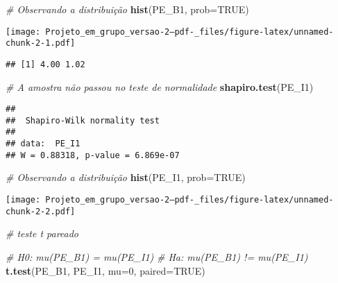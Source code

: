 \documentclass[
]{article}
\newenvironment{Shaded}{\begin{snugshade}}{\end{snugshade}}
\newcommand{\AttributeTok}[1]{\textcolor[rgb]{0.13,0.29,0.53}{#1}}
\newcommand{\CommentTok}[1]{\textcolor[rgb]{0.56,0.35,0.01}{\textit{#1}}}
\newcommand{\ConstantTok}[1]{\textcolor[rgb]{0.56,0.35,0.01}{#1}}
\newcommand{\DecValTok}[1]{\textcolor[rgb]{0.00,0.00,0.81}{#1}}
\newcommand{\FunctionTok}[1]{\textcolor[rgb]{0.13,0.29,0.53}{\textbf{#1}}}
\newcommand{\NormalTok}[1]{#1}
\newcommand{\OtherTok}[1]{\textcolor[rgb]{0.56,0.35,0.01}{#1}}
\newcommand{\SpecialCharTok}[1]{\textcolor[rgb]{0.81,0.36,0.00}{\textbf{#1}}}
\begin{document}
\begin{Shaded}
\begin{Highlighting}[]
\CommentTok{\# Observando a distribuição}
\FunctionTok{hist}\NormalTok{(PE\_B1, }\AttributeTok{prob=}\ConstantTok{TRUE}\NormalTok{)}
\end{Highlighting}
\end{Shaded}

\texttt{[image: Projeto\_em\_grupo\_versao-2--pdf-\_files/figure-latex/unnamed-chunk-2-1.pdf]}

\begin{Shaded}
\end{Shaded}

\begin{verbatim}
## [1] 4.00 1.02
\end{verbatim}

\begin{Shaded}
\begin{Highlighting}[]
\CommentTok{\# A amostra não passou no teste de normalidade}
\FunctionTok{shapiro.test}\NormalTok{(PE\_I1)}
\end{Highlighting}
\end{Shaded}

\begin{verbatim}
## 
##  Shapiro-Wilk normality test
## 
## data:  PE_I1
## W = 0.88318, p-value = 6.869e-07
\end{verbatim}

\begin{Shaded}
\begin{Highlighting}[]
\CommentTok{\# Observando a distribuição}
\FunctionTok{hist}\NormalTok{(PE\_I1, }\AttributeTok{prob=}\ConstantTok{TRUE}\NormalTok{)}
\end{Highlighting}
\end{Shaded}

\texttt{[image: Projeto\_em\_grupo\_versao-2--pdf-\_files/figure-latex/unnamed-chunk-2-2.pdf]}

\begin{Shaded}
\begin{Highlighting}[]
\CommentTok{\# teste t pareado}

\CommentTok{\# H0: mu(PE\_B1) = mu(PE\_I1)}
\CommentTok{\# Ha: mu(PE\_B1) != mu(PE\_I1)}
\FunctionTok{t.test}\NormalTok{(PE\_B1, PE\_I1, }\AttributeTok{mu=}\DecValTok{0}\NormalTok{, }\AttributeTok{paired=}\ConstantTok{TRUE}\NormalTok{)}
\end{Highlighting}
\end{Shaded}
\end{document}
